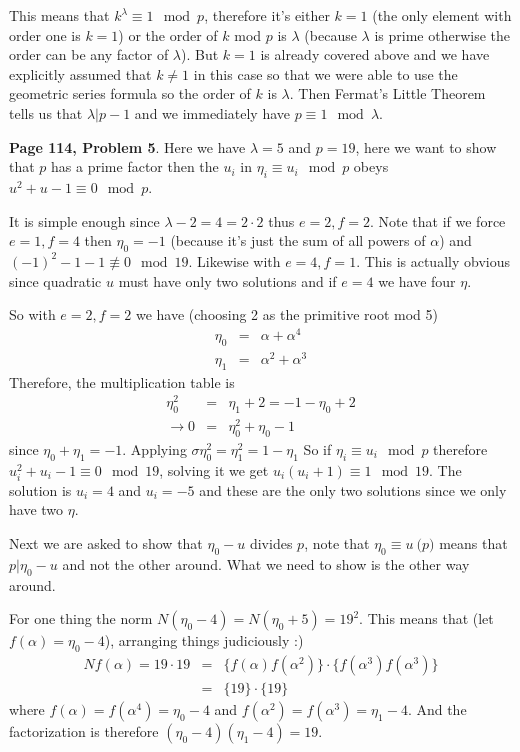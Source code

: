 \documentclass[aps,preprint,preprintnumbers,nofootinbib,showpacs,prd]{revtex4-1}
\newcommand{\nbea}{\begin{eqnarray*}}
\newcommand{\neea}{\end{eqnarray*}}
\begin{document}
This means that $k^\lambda \equiv 1 \mod{p}$, therefore it's either $k = 1$ (the only element with order one is $k = 1$) or the order of $k$ mod $p$ is $\lambda$ (because $\lambda$ is prime otherwise the order can be any factor of $\lambda$). But $k = 1$ is already covered above and we have explicitly assumed that $k\neq1$ in this case so that we were able to use the geometric series formula so the order of $k$ is $\lambda$. Then Fermat's Little Theorem tells us that $\lambda|p - 1$ and we immediately have $p \equiv 1 \mod{\lambda}$.

{\bf Page 114, Problem 5}. Here we have $\lambda = 5$ and $p = 19$, here we want to show that $p$ has a prime factor then the $u_i$ in $\eta_i \equiv u_i \mod{p}$ obeys $u^2 + u - 1 \equiv 0 \mod{p}$.

It is simple enough since $\lambda - 2 = 4 = 2\cdot 2$ thus $e = 2, f = 2$. Note that if we force $e = 1, f = 4$ then $\eta_0 = -1$ (because it's just the sum of all powers of $\alpha$) and $(-1)^2 - 1 - 1 \not \equiv 0 \mod{19}$. Likewise with $e = 4, f = 1$. This is actually obvious since quadratic $u$ must have only two solutions and if $e = 4$ we have four $\eta$.

So with $e = 2, f = 2$ we have (choosing 2 as the primitive root mod 5)
%
\nbea
\eta_0 & = & \alpha + \alpha^4 \\
\eta_1 & = & \alpha^2 + \alpha^3
\neea
% 
Therefore, the multiplication table is
%
\nbea
\eta_0^2 & = & \eta_1 + 2 = -1 - \eta_0 +2 \\
\to 0 & = & \eta_0^2 + \eta_0 - 1
\neea
%
since $\eta_0 + \eta_1 = -1$. Applying $\sigma\eta_0^2 = \eta_1^2 = 1 - \eta_1$ So if $\eta_i \equiv u_i \mod{p}$ therefore $u_i^2 + u_i - 1 \equiv 0 \mod{19}$, solving it we get $u_i(u_i + 1) \equiv 1 \mod{19}$. The solution is $u_i = 4$ and $u_i = -5$ and these are the only two solutions since we only have two $\eta$.

Next we are asked to show that $\eta_0 - u$ divides $p$, note that $\eta_0 \equiv u \pod{p}$ means that $p|\eta_0 - u$ and not the other around. What we need to show is the other way around.

For one thing the norm $N(\eta_0 - 4) = N(\eta_0 + 5) = 19^2$. This means that (let $f(\alpha) = \eta_0 - 4$), arranging things judiciously :)
%
\nbea
Nf(\alpha) = 19\cdot 19 & = & \{f(\alpha)f(\alpha^2) \} \cdot \{f(\alpha^3)f(\alpha^3)\} \\
& = & \{19 \} \cdot \{19\}
\neea
%
where $f(\alpha) = f(\alpha^4) = \eta_0 - 4$ and $f(\alpha^2) = f(\alpha^3) = \eta_1 - 4$. And the factorization is therefore $(\eta_0 - 4)(\eta_1 - 4) = 19$.
\end{document}
